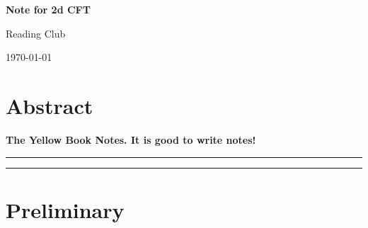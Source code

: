 \documentclass[submission, PhysLectNotes]{SciPost}
\begin{document}
\begin{center}{\Large \textbf{
Note for 2d CFT\\
}}\end{center}

\begin{center}
Reading Club%
\end{center}

\begin{center}
\end{center}

\begin{center}
\today
\end{center}


\section*{Abstract}
{\bf
The Yellow Book Notes. It is good to write notes!
}


\vspace{10pt}
\noindent\rule{\textwidth}{1pt}
\tableofcontents\thispagestyle{fancy}
\noindent\rule{\textwidth}{1pt}
\vspace{10pt}


\section{Preliminary}
\end{document}
